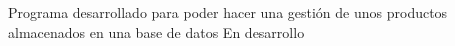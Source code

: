 Programa desarrollado para poder hacer una gestión de unos productos almacenados en una base de datos En desarrollo 